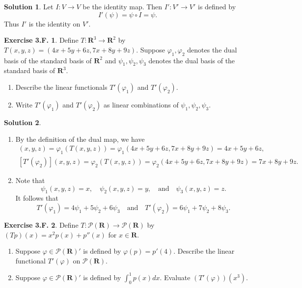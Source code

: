 \documentclass[12pt]{article}
\theoremstyle{definition}
\theoremstyle{exercise}
\newtheorem{exercise}{Exercise 3.F.}
\theoremstyle{solution}
\newtheorem*{solution}{Solution}
\newcommand{\poly}{\mathcal{P}}
\newcommand{\quand}{\quad \text{and} \quad}
\newcommand{\R}{\mathbf{R}}
\begin{document}
\begin{solution}
    Let \( I : V \to V \) be the identity map. Then \( I' : V' \to V' \) is defined by
    \[
        I'(\psi) = \psi \circ I = \psi.
    \]
    Thus \( I' \) is the identity on \( V' \).
\end{solution}

\begin{exercise}
\label{ex:13}
    Define \( T : \R^3 \to \R^2 \) by \( T(x, y, z) = (4x + 5y + 6z, 7x + 8y + 9z) \). Suppose \( \varphi_1, \varphi_2 \) denotes the dual basis of the standard basis of \( \R^2 \) and \( \psi_1, \psi_2, \psi_3 \) denotes the dual basis of the standard basis of \( \R^3 \).
    \begin{enumerate}
        \item Describe the linear functionals \( T'(\varphi_1) \) and \( T'(\varphi_2) \).

        \item Write \( T'(\varphi_1) \) and \( T'(\varphi_2) \) as linear combinations of \( \psi_1, \psi_2, \psi_3 \).
    \end{enumerate}
\end{exercise}

\begin{solution}
    \begin{enumerate}
        \item By the definition of the dual map, we have
        \begin{gather*}
            [T'(\varphi_1)](x, y, z) = \varphi_1(T(x, y, z)) = \varphi_1(4x + 5y + 6z, 7x + 8y + 9z) = 4x + 5y + 6z, \\[2mm]
            [T'(\varphi_2)](x, y, z) = \varphi_2(T(x, y, z)) = \varphi_2(4x + 5y + 6z, 7x + 8y + 9z) = 7x + 8y + 9z.
        \end{gather*}

        \item Note that
        \[
            \psi_1(x, y, z) = x, \quad \psi_2(x, y, z) = y, \quand \psi_3(x, y, z) = z.
        \]
        It follows that
        \[
            T'(\varphi_1) = 4 \psi_1 + 5 \psi_2 + 6 \psi_3 \quand T'(\varphi_2) = 6 \psi_1 + 7 \psi_2 + 8 \psi_3.
        \]
    \end{enumerate}
\end{solution}

\begin{exercise}
\label{ex:14}
    Define \( T : \poly(\R) \to \poly(\R) \) by \( (Tp)(x) = x^2 p(x) + p''(x) \) for \( x \in \R \).
    \begin{enumerate}
        \item Suppose \( \varphi \in \poly(\R)' \) is defined by \( \varphi(p) = p'(4) \). Describe the linear functional \( T'(\varphi) \) on \( \poly(\R) \).

        \item Suppose \( \varphi \in \poly(\R)' \) is defined by \( \int_0^1 p(x) dx \). Evaluate \( (T'(\varphi))(x^3) \).
    \end{enumerate}
\end{exercise}
\end{document}
